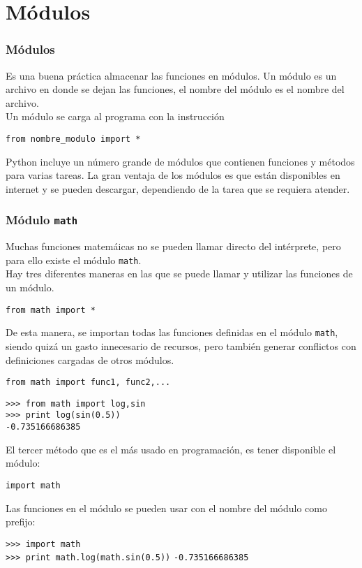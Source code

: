 \documentclass[12pt]{beamer}
\begin{document}
\section{M\'{o}dulos}
\begin{frame}[fragile]
\frametitle{M\'{o}dulos}
Es una buena pr\'{a}ctica almacenar las funciones en m\'{o}dulos. Un m\'{o}dulo es un archivo en donde se dejan las funciones, el nombre del m\'{o}dulo es el nombre del archivo.
\\
\bigskip
Un m\'{o}dulo se carga al programa con la instrucci\'{o}n
\begin{center}
\verb|from nombre_modulo import *|
\end{center}
Python incluye un n\'{u}mero grande de m\'{o}dulos que contienen funciones y m\'{e}todos para varias tareas. La gran ventaja de los m\'{o}dulos es que est\'{a}n disponibles en internet y se pueden descargar, dependiendo de la tarea que se requiera atender.
\end{frame}
\begin{frame}[fragile]
\frametitle{M\'{o}dulo \texttt{math}}
Muchas funciones matem\'{a}icas no se pueden llamar directo del int\'{e}rprete, pero para ello existe el m\'{o}dulo \texttt{math}.
\\
\bigskip
Hay tres diferentes maneras en las que se puede llamar y utilizar las funciones de un m\'{o}dulo.
\begin{exampleblock}{}
\verb|from math import *|
\end{exampleblock}
De esta manera, se importan todas las funciones definidas en el m\'{o}dulo \texttt{math}, siendo quiz\'{a} un gasto innecesario de recursos, pero tambi\'{e}n generar conflictos con definiciones cargadas de otros m\'{o}dulos.
\end{frame}
\begin{frame}[fragile]
\begin{exampleblock}{}
\verb|from math import func1, func2,...|
\end{exampleblock}
\pause
\begin{exampleblock}{}
\verb|>>> from math import log,sin| \\
\verb|>>> print log(sin(0.5))| \\
\verb|-0.735166686385|
\end{exampleblock}
\end{frame}
\begin{frame}[fragile]
El tercer m\'{e}todo que es el m\'{a}s usado en programaci\'{o}n, es tener disponible el m\'{o}dulo:
\begin{center}
\verb|import math|
\end{center}
Las funciones en el m\'{o}dulo se pueden usar con el nombre del m\'{o}dulo como prefijo:
\begin{exampleblock}{}
\verb|>>> import math| \\
\verb|>>> print math.log(math.sin(0.5))|
\verb|-0.735166686385|
\end{exampleblock}
\end{frame}
\end{document}
